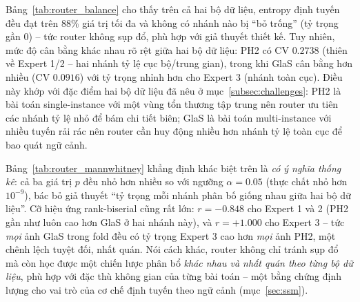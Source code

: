 Bảng~\ref{tab:router_balance} cho thấy trên cả hai bộ dữ liệu, entropy định tuyến đều đạt trên $88\%$ giá trị tối đa và không có nhánh nào bị ``bỏ trống'' (tỷ trọng gần $0$) -- tức router không sụp đổ, phù hợp với giả thuyết thiết kế. Tuy nhiên, mức độ cân bằng khác nhau rõ rệt giữa hai bộ dữ liệu: PH2 có CV $0.2738$ (thiên về Expert 1/2 -- hai nhánh tỷ lệ cục bộ/trung gian), trong khi GlaS cân bằng hơn nhiều (CV $0.0916$) với tỷ trọng nhỉnh hơn cho Expert 3 (nhánh toàn cục). Điều này khớp với đặc điểm hai bộ dữ liệu đã nêu ở mục~\ref{subsec:challenges}: PH2 là bài toán single-instance với một vùng tổn thương tập trung nên router ưu tiên các nhánh tỷ lệ nhỏ để bám chi tiết biên; GlaS là bài toán multi-instance với nhiều tuyến rải rác nên router cần huy động nhiều hơn nhánh tỷ lệ toàn cục để bao quát ngữ cảnh.

\begin{table}[h]
\centering
\caption{Kiểm định Mann-Whitney U so sánh tỷ trọng mỗi nhánh giữa PH2 và GlaS 2015 (theo từng ảnh, fold 1).}
\label{tab:router_mannwhitney}
\end{table}

Bảng~\ref{tab:router_mannwhitney} khẳng định khác biệt trên là \emph{có ý nghĩa thống kê}: cả ba giá trị $p$ đều nhỏ hơn nhiều so với ngưỡng $\alpha=0.05$ (thực chất nhỏ hơn $10^{-9}$), bác bỏ giả thuyết ``tỷ trọng mỗi nhánh phân bố giống nhau giữa hai bộ dữ liệu''. Cỡ hiệu ứng rank-biserial cũng rất lớn: $r=-0.848$ cho Expert 1 và 2 (PH2 gần như luôn cao hơn GlaS ở hai nhánh này), và $r=+1.000$ cho Expert 3 -- tức \emph{mọi} ảnh GlaS trong fold đều có tỷ trọng Expert 3 cao hơn \emph{mọi} ảnh PH2, một chênh lệch tuyệt đối, nhất quán. Nói cách khác, router không chỉ tránh sụp đổ mà còn học được một chiến lược phân bổ \emph{khác nhau và nhất quán theo từng bộ dữ liệu}, phù hợp với đặc thù không gian của từng bài toán -- một bằng chứng định lượng cho vai trò của cơ chế định tuyến theo ngữ cảnh (mục~\ref{sec:ssm}).

